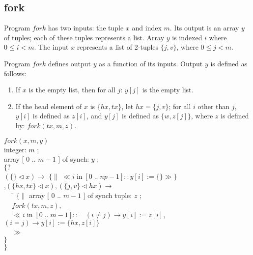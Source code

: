 \subsection{fork}
Program $fork$ has two inputs: the tuple $x$ and index $m$.
Its output is an array $y$ of tuples; each of these tuples
represents a list.
Array $y$ is indexed $i$ where $0 \leq i < m$.
The input $x$ represents a list of 2-tuples $\{j,v\}$, where $0 \leq j < m$.

Program $fork$ defines output $y$ as a function of its inputs.
Output $y$ is defined as follows:
\begin{enumerate}
   \item If $x$ is the empty list,
         then for all $j$: $y[j]$ is the empty list.
   \item If the head element of $x$ is $\{hx,tx\}$, let $hx = \{j,v\}$;
         for all $i$ other than $j$, $y[i]$ is defined as $z[i]$, and
         $y[j]$ is defined as $\{w,z[j]\}$, where $z$ is defined by: 
         $fork(tx,m,z)$.
\end{enumerate}
 

\begin{tabbing}
$fork(x,m,y)$ \\
integer: $m$ ; \\
array $[$ 0 .. $m-1$ $]$ of synch: $y$ ; \\
$\{?$\\
$(\{\}  \lhd x) \rightarrow$ 
$\{ \|$ $\ll i \; $in$ \; [0  \; .. \; np-1]:: y[i] := \{\} \gg \}$ \\
,$(\{ hx  , tx \} \lhd x), (\{j,v\} \lhd hx) \rightarrow$  \\
$\; \; \; \;$ \= $\{ \|$ array $[$ 0 .. $m-1$ $]$ of synch tuple: $z$ ; \\
\> $\; \; \;$ $fork(tx,m,z),$ \\
\> $\; \; \;$ $\ll i \; $in$ \; [0  \; .. \; m-1]:: \;$ \= $(i \not = j) 
\rightarrow y[i] := z[i]$, \\
\> \> $(i  = j) \rightarrow y[i] := \{ hx  , z[i] \}$  \\
\> $\; \; \;$ $\gg$  \\
\> $\}$ \\
$\}$
\end{tabbing}

